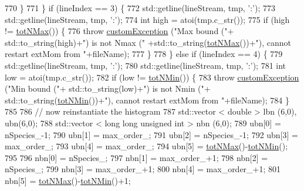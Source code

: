 \begin{DoxyCode}
770             \}
771         \} \textcolor{keywordflow}{if} (lineIndex == 3) \{
772             std::getline(lineStream, tmp, \textcolor{charliteral}{':'});
773             std::getline(lineStream, tmp, \textcolor{charliteral}{':'});
774             \textcolor{keywordtype}{int} high = atoi(tmp.c\_str());
775             \textcolor{keywordflow}{if} (high != \hyperlink{classsim_system_aee2c65ecb43a35c0c4d070cdb45f7dc0}{totNMax}()) \{
776                 \textcolor{keywordflow}{throw} \hyperlink{classcustom_exception}{customException} (\textcolor{stringliteral}{"Max bound ("}+ std::to\_string(high)+\textcolor{stringliteral}{") is not Nmax ("}
      +std::to\_string(\hyperlink{classsim_system_aee2c65ecb43a35c0c4d070cdb45f7dc0}{totNMax}())+\textcolor{stringliteral}{"), cannot restart extMom from "}+fileName);
777             \}
778         \} \textcolor{keywordflow}{else} \textcolor{keywordflow}{if} (lineIndex == 4) \{
779             std::getline(lineStream, tmp, \textcolor{charliteral}{':'});
780             std::getline(lineStream, tmp, \textcolor{charliteral}{':'});
781             \textcolor{keywordtype}{int} low = atoi(tmp.c\_str());
782             \textcolor{keywordflow}{if} (low != \hyperlink{classsim_system_af10842e0eaa638373b8717c87b47e6bc}{totNMin}()) \{
783                 \textcolor{keywordflow}{throw} \hyperlink{classcustom_exception}{customException} (\textcolor{stringliteral}{"Min bound ("}+ std::to\_string(low)+\textcolor{stringliteral}{") is not Nmin ("}+
      std::to\_string(\hyperlink{classsim_system_af10842e0eaa638373b8717c87b47e6bc}{totNMin}())+\textcolor{stringliteral}{"), cannot restart extMom from "}+fileName);
784             \}
785 
786             \textcolor{comment}{// now reinstantiate the histogram}
787             std::vector < double > lbn (6,0), ubn(6,0);
788             std::vector < long long unsigned int > nbn (6,0);
789             ubn[0] = nSpecies\_-1;
790             ubn[1] = max\_order\_;
791             ubn[2] = nSpecies\_-1;
792             ubn[3] = max\_order\_;
793             ubn[4] = max\_order\_;
794             ubn[5] = \hyperlink{classsim_system_aee2c65ecb43a35c0c4d070cdb45f7dc0}{totNMax}()-\hyperlink{classsim_system_af10842e0eaa638373b8717c87b47e6bc}{totNMin}();
795 
796             nbn[0] = nSpecies\_;
797             nbn[1] = max\_order\_+1;
798             nbn[2] = nSpecies\_;
799             nbn[3] = max\_order\_+1;
800             nbn[4] = max\_order\_+1;
801             nbn[5] = \hyperlink{classsim_system_aee2c65ecb43a35c0c4d070cdb45f7dc0}{totNMax}()-\hyperlink{classsim_system_af10842e0eaa638373b8717c87b47e6bc}{totNMin}()+1;

\end{DoxyCode}
